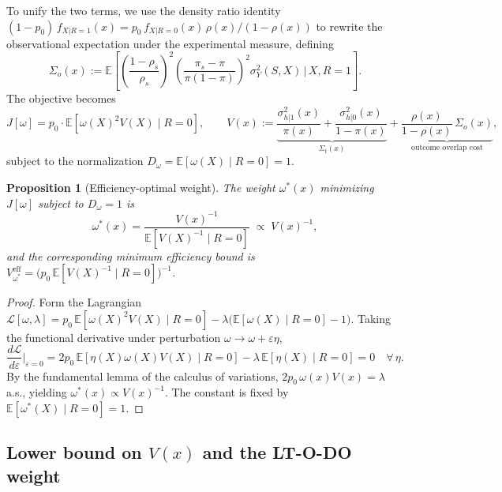 \documentclass{article}
\theoremstyle{plain}
\newtheorem{proposition}[theorem]{Proposition}
\theoremstyle{definition}
\theoremstyle{remark}
\newcommand{\1}{\mathds{1}}                %
\begin{document}
To unify the two terms, we use the density ratio identity
$(1-p_0)\,f_{X|R=1}(x) = p_0\,f_{X|R=0}(x)\,\rho(x)/(1-\rho(x))$ to rewrite the
observational expectation under the experimental measure, defining
\begin{equation}
\Sigma_o(x) := \mathbb{E}\!\left[
\left(\frac{1-\rho_s}{\rho_s}\right)^{\!2}
\!\left(\frac{\pi_s - \pi}{\pi(1-\pi)}\right)^{\!2}
\sigma^2_Y(S,X) \,\Big|\, X, R=1\right].
\end{equation}
The objective becomes
\begin{equation}
J[\omega] = p_0 \cdot \mathbb{E}\!\left[\omega(X)^2 V(X) \mid R=0\right],
\qquad
V(x) := \underbrace{\frac{\sigma^2_{h|1}(x)}{\pi(x)} + \frac{\sigma^2_{h|0}(x)}{1-\pi(x)}}_{\Sigma_t(x)}
+ \underbrace{\frac{\rho(x)}{1-\rho(x)}\,\Sigma_o(x)}_{\text{outcome overlap cost}},
\label{eq:Vx}
\end{equation}
subject to the normalization $D_\omega = \mathbb{E}[\omega(X) \mid R=0] = 1$.

\begin{proposition}[Efficiency-optimal weight]
\label{prop:optimal_weight}
The weight $\omega^*(x)$ minimizing $J[\omega]$ subject to $D_\omega = 1$ is
\begin{equation}
\omega^*(x) = \frac{V(x)^{-1}}{\mathbb{E}\!\left[V(X)^{-1} \mid R=0\right]}
\;\propto\; V(x)^{-1},
\label{eq:omega_star}
\end{equation}
and the corresponding minimum efficiency bound is
$V^{\text{eff}}_{\omega^*} = \big(p_0\,\mathbb{E}[V(X)^{-1} \mid R=0]\big)^{-1}$.
\end{proposition}

\begin{proof}
Form the Lagrangian
$\mathcal{L}[\omega, \lambda] = p_0\,\mathbb{E}[\omega(X)^2 V(X) \mid R=0]
- \lambda\big(\mathbb{E}[\omega(X) \mid R=0] - 1\big)$.
Taking the functional derivative under perturbation $\omega \to \omega + \varepsilon\eta$,
\begin{equation}
\frac{d\mathcal{L}}{d\varepsilon}\bigg|_{\varepsilon=0}
= 2p_0\,\mathbb{E}[\eta(X)\omega(X)V(X) \mid R=0]
- \lambda\,\mathbb{E}[\eta(X) \mid R=0] = 0 \quad \forall\,\eta.
\end{equation}
By the fundamental lemma of the calculus of variations,
$2p_0\,\omega(x)V(x) = \lambda$ a.s., yielding $\omega^*(x) \propto V(x)^{-1}$.
The constant is fixed by $\mathbb{E}[\omega^*(X) \mid R=0] = 1$.
\end{proof}

\subsection{Lower bound on $V(x)$ and the LT-O-DO weight}
\label{sec:lower_bound}
\end{document}
